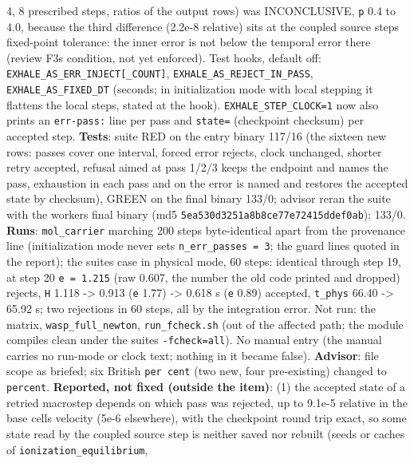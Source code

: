 \documentclass[english,a4paper]{my_memo}
\begin{document}
\begin{itemize}
  4, 8 prescribed steps, ratios of the output rows) was INCONCLUSIVE, \texttt{p}
  0.4 to 4.0, because the third difference (2.2e-8 relative) sits at the
  coupled source step\textquotesingle s fixed-point tolerance: the inner error is not
  below the temporal error there (review F3\textquotesingle s condition, not yet
  enforced). Test hooks, default off: \texttt{EXHALE\_AS\_ERR\_INJECT{[}\_COUNT{]}},
  \texttt{EXHALE\_AS\_REJECT\_IN\_PASS}, \texttt{EXHALE\_AS\_FIXED\_DT} (seconds; in
  initialization mode with local stepping it flattens the local steps,
  stated at the hook). \texttt{EXHALE\_STEP\_CLOCK=1} now also prints an \texttt{err-pass:}
  line per pass and \texttt{state=} (checkpoint checksum) per accepted step.
  \textbf{Tests}: suite RED on the entry binary 117/16 (the sixteen new rows:
  passes cover one interval, forced error rejects, clock unchanged,
  shorter retry accepted, refusal aimed at pass 1/2/3 keeps the endpoint
  and names the pass, exhaustion in each pass and on the error is named
  and restores the accepted state by checksum), GREEN on the final binary
  133/0; advisor reran the suite with the worker\textquotesingle s final binary (md5
  \texttt{5ea530d3251a8b8ce77e72415ddef0ab}): 133/0. \textbf{Runs}: \texttt{mol\_carrier}
  marching 200 steps byte-identical apart from the provenance line
  (initialization mode never sets \texttt{n\_err\_passes\ =\ 3}; the guard lines
  quoted in the report); the suite\textquotesingle s case in physical mode, 60 steps:
  identical through step 19, at step 20 \texttt{e\ =\ 1.215} (raw 0.607, the number
  the old code printed and dropped) rejects, \texttt{H} 1.118 -\textgreater{} 0.913 (\texttt{e} 1.77)
  -\textgreater{} 0.618 s (\texttt{e} 0.89) accepted, \texttt{t\_phys} 66.40 -\textgreater{} 65.92 s; two
  rejections in 60 steps, all by the integration error. Not run: the
  matrix, \texttt{wasp\_full\_newton}, \texttt{run\_fcheck.sh} (out of the affected path;
  the module compiles clean under the suite\textquotesingle s \texttt{-fcheck=all}). No manual
  entry (the manual carries no run-mode or clock text; nothing in it
  became false). \textbf{Advisor}: file scope as briefed; six British \texttt{per\ cent} (two new, four pre-existing) changed to \texttt{percent}. \textbf{Reported, not
  fixed (outside the item)}: (1) the accepted state of a retried
  macrostep depends on which pass was rejected, up to 9.1e-5 relative in
  the base cell\textquotesingle s velocity (5e-6 elsewhere), with the checkpoint round trip
  exact, so some state read by the coupled source step is neither saved nor
  rebuilt (seeds or caches of \texttt{ionization\_equilibrium},

\end{itemize}
\end{document}
